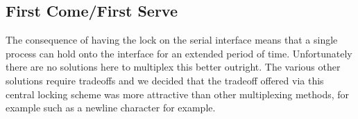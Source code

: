 \subsection{First Come/First Serve}
The consequence of having the lock on the serial interface means that a single process can hold onto the interface for an extended period of time. Unfortunately there are no solutions here to multiplex this better outright. The various other solutions require tradeoffs and we
decided that the tradeoff offered via this central locking scheme was more attractive than other multiplexing methods, for example such as a newline character for example.
